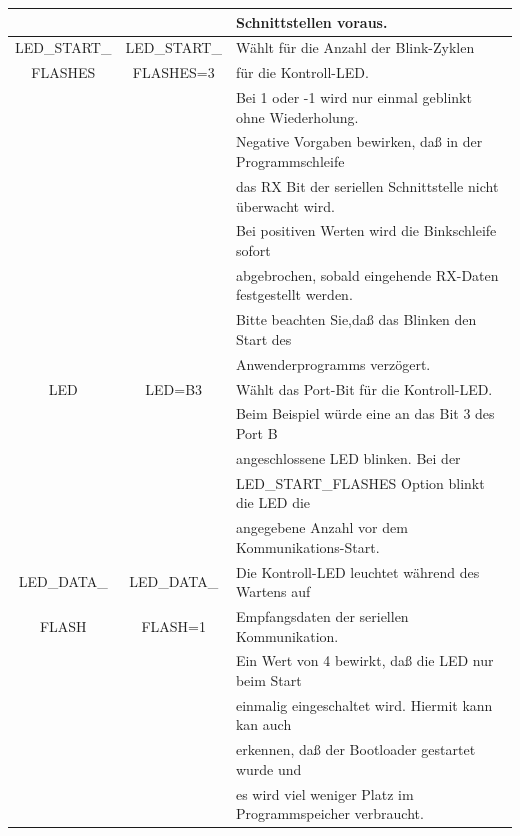 \begin{table}[H]
\begin{center}
\begin{tabular}{| c | c | l |}
                   &                & Schnittstellen voraus. \\
    \hline
 LED\_START\_      & LED\_START\_   & Wählt für die Anzahl der Blink-Zyklen \\
   FLASHES         &   FLASHES=3    & für die Kontroll-LED.                            \\
                   &                & Bei 1 oder -1 wird nur einmal geblinkt ohne Wiederholung. \\
                   &                & Negative Vorgaben bewirken, daß in der Programmschleife \\
                   &                & das RX Bit der seriellen Schnittstelle nicht überwacht wird. \\
                   &                & Bei positiven Werten wird die Binkschleife sofort \\
		   &                & abgebrochen, sobald eingehende RX-Daten festgestellt werden. \\
                   &                & Bitte beachten Sie,daß das Blinken den Start des \\
                   &                & Anwenderprogramms verzögert. \\
    \hline
 LED               & LED=B3         & Wählt das Port-Bit für die  Kontroll-LED. \\
                   &                & Beim Beispiel würde eine an das Bit 3 des Port B \\ 
                   &                & angeschlossene LED blinken. Bei der \\
                   &                & LED\_START\_FLASHES  Option  blinkt die LED die\\
                   &                & angegebene Anzahl vor dem Kommunikations-Start. \\
    \hline
 LED\_DATA\_       & LED\_DATA\_    & Die Kontroll-LED leuchtet während des Wartens auf \\
      FLASH        &    FLASH=1     & Empfangsdaten der seriellen Kommunikation.\\
	           &                & Ein Wert von 4 bewirkt, daß die LED nur beim Start \\
		   &                & einmalig eingeschaltet wird. Hiermit kann kan auch \\
		   &                & erkennen, daß der Bootloader gestartet wurde und \\
		   &                & es wird viel weniger Platz im Programmspeicher verbraucht. \\

\end{tabular}
\end{center}
\end{table}
